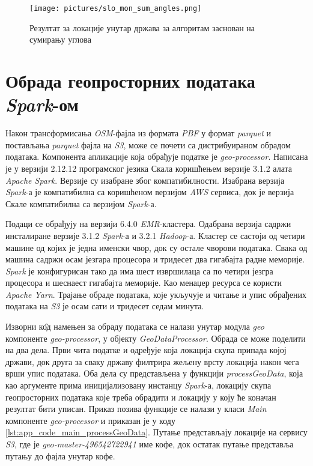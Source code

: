 \documentclass[12pt,oneside]{memoir}
\begin{document}
\begin{figure}[!ht]
  \centering
  \texttt{[image: pictures/slo\_mon\_sum\_angles.png]}
  \caption{Резултат за локације унутар држава за алгоритам заснован на сумирању углова}
  \label{fig:slo_mon_example}
\end{figure}

\section{Обрада геопросторних података \textit{Spark}-ом}
\label{sec:osm_spark_obrada}

Након трансформисања \textit{OSM}-фајла из формата \textit{PBF} у формат \textit{parquet} и постављања \textit{parquet} фајла на \textit{S3}, може се почети са дистрибуираном обрадом података. Компонента апликације која обрађује податке је \textit{geo-processor}. Написана је у верзији 2.12.12 програмског језика Скала коришћењем верзије 3.1.2 алата \textit{Apache Spark}. Верзије су изабране због компатибилности. Изабрана верзија \textit{Spark}-а је компатибилна са коришћеном верзијом \textit{AWS} сервиса, док је верзија Скале компатибилна са верзијом \textit{Spark}-а.

Подаци се обрађују на верзији 6.4.0 \textit{EMR}-кластера. Одабрана верзија садржи инсталиране верзије 3.1.2 \textit{Spark}-а и 3.2.1 \textit{Hadoop}-а. Кластер се састоји од четири машине од којих је једна именски чвор, док су остале чворови података. Свака од машина садржи осам језгара процесора и тридесет два гигабајта радне меморије. \textit{Spark} је конфигурисан тако да има шест извршилаца са по четири језгра процесора и шеснаест гигабајта меморије. Као менаџер ресурса се користи \textit{Apache Yarn}.
Трајање обраде података, које укључује и читање и упис обрађених података на \textit{S3} је осам сати и тридесет седам минута.

Изворни к\^{о}д намењен за обраду података се налази унутар модула	 \textit{geo} компоненте \textit{geo-processor}, у објекту \textit{GeoDataProcessor}. Обрада се може поделити на два дела. Први чита податке и одређује која локација скупа припада којој држави, док друга за сваку државу филтрира жељену врсту локација након чега врши упис података. Оба дела су представљена у функцији \textit{processGeoData}, која као аргументе прима иницијализовану инстанцу \textit{Spark}-а, локацију скупа геопросторних података које треба обрадити и локацију у коју ће коначан резултат бити уписан. Приказ позива функције се налази у класи \textit{Main} компоненте \textit{geo-processor} и приказан је у коду \ref{lst:app_code_main_processGeoData}. Путање представљају локације на сервису \textit{S3}, где је \textit{geo-master-496542722941} име кофе, док остатак путање представља путању до фајла унутар кофе.
\end{document}
